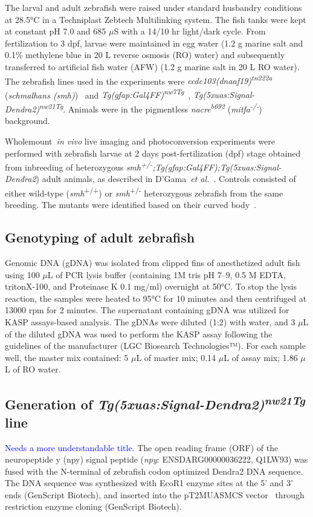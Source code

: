 \documentclass[fleqn]{wlscirep}
\newcommand{\lyng}[1]{\textcolor{blue}{#1}}
\begin{document}
The larval and adult zebrafish were raised under standard husbandry
conditions at 28.5°C in a Techniplast Zebtech Multilinking system.
The fish tanks were kept at constant pH 7.0 and 685 $\mu$S with a
14/10 hr light/dark cycle.
From fertilization to 3 dpf, larvae were maintained in egg
water (1.2 g marine salt and 0.1\% methylene blue in 20 L reverse osmosis (RO) water)
and subsequently transferred to artificial fish water (AFW)
(1.2 g marine salt in 20 L RO water). The zebrafish lines used in the experiments were
\emph{ccdc103(dnaaf19)\textsuperscript{tn222a}}
(\emph{schmalhans (smh)})~\cite{Jau-NianChen1997Left-rightZebrafish}
and \emph{Tg(gfap:Gal4FF)\textsuperscript{nw7Tg}}~\cite{DiazVerdugo2019Glia-neuronSeizures},
\emph{Tg(5xuas:Signal-Dendra2)\textsuperscript{nw21Tg}}.
Animals were in the pigmentless \emph{nacre\textsuperscript{b692}}
(\emph{mitfa\textsuperscript{-/-}})~\cite{JamesA.Lister1999NacreFate} background.

Wholemount~\emph{in vivo} live imaging and photoconversion
experiments were performed with zebrafish larvae at 2 days post-fertilization (dpf) stage obtained from inbreeding of heterozygous
\emph{smh\textsuperscript{+/-};Tg(gfap:Gal4FF);Tg(5xuas:Signal-Dendra2})
adult animals, as described in D'Gama~\emph{et al.}~\cite{DGama2024Cilia-mediatedBrain}.
Controls consisted of either wild-type (\emph{smh}\textsuperscript{+/+})
or \emph{smh}\textsuperscript{+/-} heterozygous zebrafish from the same breeding.
The mutants were identified based on their curved body~\cite{Jau-NianChen1997Left-rightZebrafish}.

\subsection*{Genotyping of adult zebrafish}
Genomic DNA (gDNA) was isolated from clipped fins of anesthetized adult
fish using 100 $\mu$L of PCR lysis buffer (containing 1M tris pH 7--9, 0.5 M EDTA,
tritonX-100, and Proteinase K 0.1 mg/ml) overnight at 50°C.
To stop the lysis reaction, the samples were heated to 95°C for 10 minutes
and then centrifuged at 13000 rpm for 2 minutes.
The supernatant containing gDNA was utilized for KASP assays-based analysis.
The gDNAs were diluted (1:2) with water, and 3 $\mu$L of the diluted gDNA was
used to perform the KASP assay following the guidelines of the manufacturer (LGC Biosearch Technologies™).
For each sample well, the master mix contained: 5 $\mu$L of master mix; 0.14
$\mu$L of assay mix; 1.86 $\mu$L of RO water.

\subsection*{Generation of \emph{Tg(5xuas:Signal-Dendra2)\textsuperscript{nw21Tg}} line}
\lyng{Needs a more understandable title.}
The open reading frame (ORF) of the neuropeptide y (npy) signal peptide
(\emph{npy}: ENSDARG00000036222, Q1LW93) was fused with the N-terminal
of zebrafish codon optimized Dendra2 DNA sequence.
The DNA sequence was synthesized with EcoR1 enzyme sites at the 5’ and
3’ ends (GenScript Biotech), and inserted into the
pT2MUASMCS vector~\cite{Asakawa2008GeneticZebrafish}
through restriction enzyme cloning (GenScript Biotech). 
\end{document}
